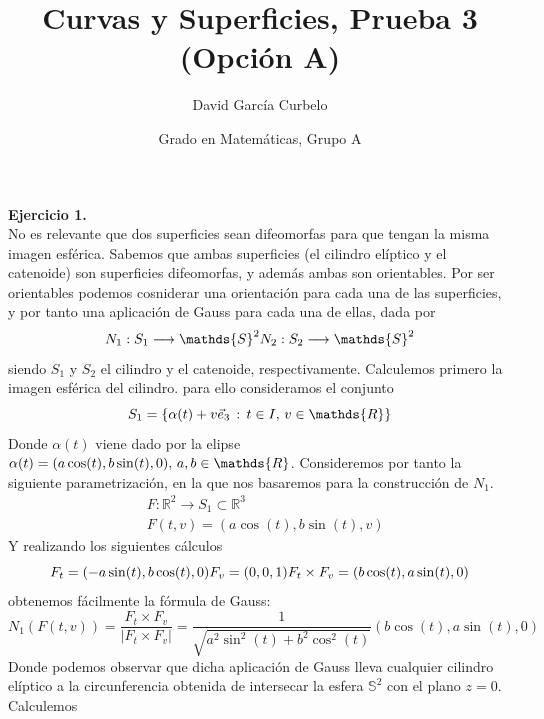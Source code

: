 \documentclass[fleqn]{article}
\author{David García Curbelo}
\title{Curvas y Superficies, Prueba 3 (Opción A)}
\date{Grado en Matemáticas, Grupo A}
\def\R{\mathds{R}}
\begin{document}
    \maketitle
    \setcounter{page}{1}
    \pagestyle{plain}

    \textbf{Ejercicio 1. } \\

    No es relevante que dos superficies sean difeomorfas para que tengan la misma imagen esférica. Sabemos que ambas superficies (el cilindro elíptico y el catenoide) 
    son superficies difeomorfas, y además ambas son orientables. Por ser orientables podemos cosniderar una orientación para cada una de las superficies, y por tanto una aplicación 
    de Gauss para cada una de ellas, dada por 
    \begin{equation*}
        N_1: S_1 \longrightarrow \mathds{S}^2\\
        N_2: S_2 \longrightarrow \mathds{S}^2
    \end{equation*}
    siendo $S_1$ y $S_2$ el cilindro y el catenoide, respectivamente. Calculemos primero la imagen esférica del cilindro. para ello consideramos el conjunto
    $$S_1 = \{\alpha(t) + v\vec{e}_3 \thinspace : \thinspace t\in I, \thinspace v\in \R\}$$
    Donde $\alpha(t)$ viene dado por la elipse $\alpha(t) = (a\cos(t), b\sin(t), 0), \thinspace a,b\in \R$. Consideremos por tanto la siguiente parametrización, en la que nos basaremos para 
    la construcción de $N_1$.
    \begin{equation*}
        \begin{aligned}
            & F:\R^2 \rightarrow S_1 \subset \R^3 \\
            &F(t,v) = (a\cos(t), b\sin(t), v)
        \end{aligned}
    \end{equation*}
    Y realizando los siguientes cálculos
    \begin{equation*}
        F_t = (-a\sin(t), b\cos(t), 0) \\
        F_v = (0,0,1) \\
        F_t \times F_v = (b\cos(t), a\sin(t), 0)
    \end{equation*}
    obtenemos fácilmente la fórmula de Gauss:
    $$N_1(F(t,v)) = \frac{F_t \times F_v}{\left|F_t \times F_v\right|} = \frac{1}{\sqrt{a^2\sin^2(t) + b^2\cos^2(t)}} (b\cos(t), a\sin(t), 0)$$
    Donde podemos observar que dicha aplicación de Gauss lleva cualquier cilindro elíptico a la circunferencia obtenida de intersecar la esfera $\mathds{S}^2$ con el plano $z=0$. Calculemos
\end{document}
